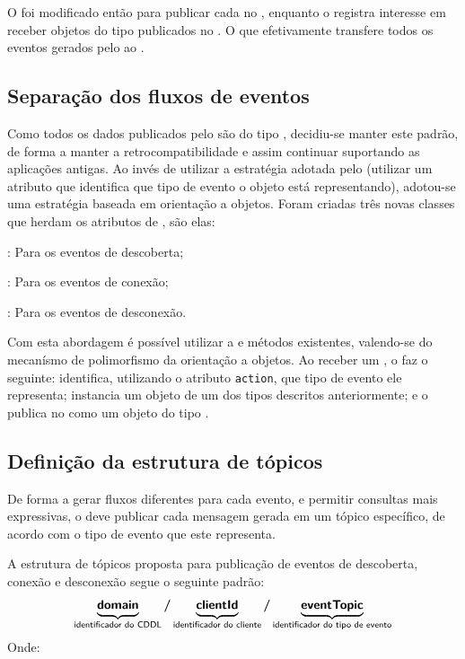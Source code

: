 O \stwopa foi modificado então para publicar cada \sensordata no \eventbus, enquanto o \qocevaluator registra interesse em receber objetos do tipo \sensordata publicados no \eventbus.
O que efetivamente transfere todos os eventos gerados pelo \stwopa ao \cddl.

\subsection{Separação dos fluxos de eventos}

Como todos os dados publicados pelo \cddl são do tipo \msg, decidiu-se manter este padrão, de forma a manter a retrocompatibilidade e assim continuar suportando as aplicações antigas.
Ao invés de utilizar a estratégia adotada pelo \mhub (utilizar um atributo que identifica que tipo de evento o objeto está representando), adotou-se uma estratégia baseada em orientação a objetos.
Foram criadas três novas classes que herdam os atributos de \msg, são elas:

\begin{alineas}
	\item \objfoundmsg: Para os eventos de descoberta;
	\item \objconnectedmsg: Para os eventos de conexão;
	\item \objdisconnectedmsg: Para os eventos de desconexão.
\end{alineas}

Com esta abordagem é possível utilizar a \api e métodos existentes, valendo-se do mecanísmo de polimorfismo da orientação a objetos.
Ao receber um \sensordata, o \qocevaluator faz o seguinte: identifica, utilizando o atributo \texttt{action}, que tipo de evento ele representa; instancia um objeto de um dos tipos descritos anteriormente; e o publica no \broker \mqtt como um objeto do tipo \msg.


\subsection{Definição da estrutura de tópicos}

De forma a gerar fluxos diferentes para cada evento, e permitir consultas mais expressivas, o \qocevaluator deve publicar cada mensagem gerada em um tópico específico, de acordo com o tipo de evento que este representa.

A estrutura de tópicos proposta para publicação de eventos de descoberta, conexão e desconexão segue o seguinte padrão:
\[
	\underbrace{\bm{\mathsf{domain}}\vphantom{p}}_{\text{\textsf{identificador do CDDL}}}
	\bm{/}
	\underbrace{\bm{\mathsf{clientId}}\vphantom{p}}_{\text{\textsf{identificador do cliente}}}
	\bm{/}
	\underbrace{\bm{\mathsf{eventTopic}}}_{\text{\textsf{identificador do tipo de evento}}}
\]
Onde:

